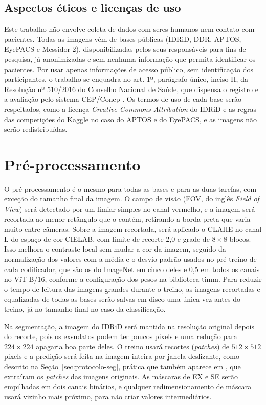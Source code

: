 \subsection{Aspectos éticos e licenças de uso}
\label{sec:etica-licencas}

Este trabalho não envolve coleta de dados com seres humanos nem contato com pacientes. Todas as imagens vêm de bases públicas (IDRiD, DDR, APTOS, EyePACS e Messidor-2), disponibilizadas pelos seus responsáveis para fins de pesquisa, já anonimizadas e sem nenhuma informação que permita identificar os pacientes. Por usar apenas informações de acesso público, sem identificação dos participantes, o trabalho se enquadra no art. 1º, parágrafo único, inciso II, da Resolução nº 510/2016 do Conselho Nacional de Saúde, que dispensa o registro e a avaliação pelo sistema CEP/Conep \cite{brasil2016res510}. Os termos de uso de cada base serão respeitados, como a licença \textit{Creative Commons Attribution} do IDRiD e as regras das competições do Kaggle no caso do APTOS e do EyePACS, e as imagens não serão redistribuídas.

\section{Pré-processamento}
\label{sec:met-preprocessamento}

O pré-processamento é o mesmo para todas as bases e para as duas tarefas, com exceção do tamanho final da imagem. O campo de visão (FOV, do inglês \textit{Field of View}) será detectado por um limiar simples no canal vermelho, e a imagem será recortada ao menor retângulo que o contém, retirando a borda preta que varia muito entre câmeras. Sobre a imagem recortada, será aplicado o CLAHE \cite{pizer1987ahe} no canal L do espaço de cor CIELAB, com limite de recorte 2,0 e grade de $8 \times 8$ blocos. Isso melhora o contraste local sem mudar a cor da imagem, seguido da normalização dos valores com a média e o desvio padrão usados no pré-treino de cada codificador, que são os do ImageNet em cinco deles e 0,5 em todos os canais no ViT-B/16, conforme a configuração dos pesos na biblioteca timm. Para reduzir o tempo de leitura das imagens grandes durante o treino, as imagens recortadas e equalizadas de todas as bases serão salvas em disco uma única vez antes do treino, já no tamanho final no caso da classificação.

Na segmentação, a imagem do IDRiD será mantida na resolução original depois do recorte, pois os exsudatos podem ter poucos pixels e uma redução para $224 \times 224$ apagaria boa parte deles. O treino usará recortes (\textit{patches}) de $512 \times 512$ pixels e a predição será feita na imagem inteira por janela deslizante, como descrito na Seção~\ref{sec:protocolo-seg}, prática que também aparece em , que extraíram os \textit{patches} das imagens originais. As máscaras de EX e SE serão empilhadas em dois canais binários, e qualquer redimensionamento de máscara usará vizinho mais próximo, para não criar valores intermediários.

